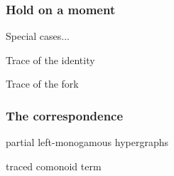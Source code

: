 \begin{frame}
    \frametitle{Hold on a moment}

    \centering
    \pause
    \LARGE
    Special cases...

    \Large
    \pause
    \vspace{0.5em}

    Trace of the identity

    \vspace{0.5em}


    \vspace{0.5em}

    Trace of the fork

    \vspace{0.5em}

\end{frame}

\begin{frame}
    \frametitle{The correspondence}

    \centering

    \begin{minipage}{0.45\textwidth}
        \begin{center}
            partial left-monogamous hypergraphs
            \vspace{1em}

        \end{center}
    \end{minipage}
    \pause
    \quad
    \raisebox{-1em}{\(\leftrightarrow\)}
    \begin{minipage}{0.45\textwidth}
        \begin{center}
            traced comonoid term

            \vspace{1em}

        \end{center}
    \end{minipage}

    \pause
    \vspace{1.5em}

    \meanddan

\end{frame}